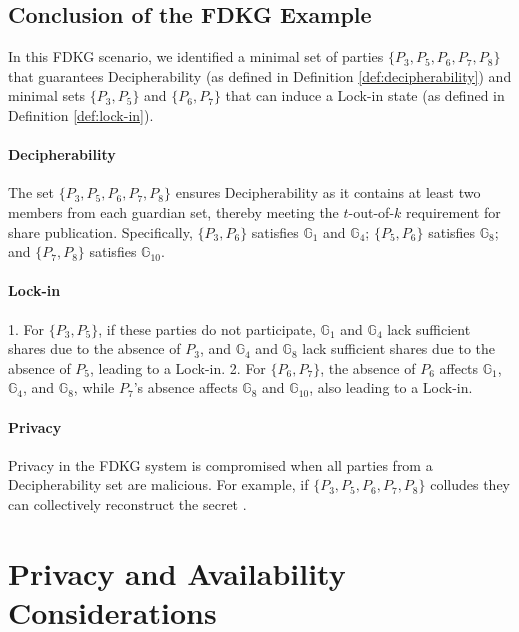 \documentclass{article}
\begin{document}
\subsection*{Conclusion of the FDKG Example}

In this FDKG scenario, we identified a minimal set of parties \(\{P_3, P_5, P_6, P_7, P_8\}\) that guarantees Decipherability (as defined in Definition \ref{def:decipherability}) and minimal sets \(\{P_3, P_5\}\) and \(\{P_6, P_7\}\) that can induce a Lock-in state (as defined in Definition \ref{def:lock-in}).

\paragraph{Decipherability}
The set \(\{P_3, P_5, P_6, P_7, P_8\}\) ensures Decipherability as it contains at least two members from each guardian set, thereby meeting the \(t\)-out-of-\(k\) requirement for share publication. Specifically, \(\{P_3, P_6\}\) satisfies \(\mathbb{G}_1\) and \(\mathbb{G}_4\); \(\{P_5, P_6\}\) satisfies \(\mathbb{G}_8\); and \(\{P_7, P_8\}\) satisfies \(\mathbb{G}_{10}\).

\paragraph{Lock-in}
1. For \(\{P_3, P_5\}\), if these parties do not participate, \(\mathbb{G}_1\) and \(\mathbb{G}_4\) lack sufficient shares due to the absence of \(P_3\), and \(\mathbb{G}_4\) and \(\mathbb{G}_8\) lack sufficient shares due to the absence of \(P_5\), leading to a Lock-in.
2. For \(\{P_6, P_7\}\), the absence of \(P_6\) affects \(\mathbb{G}_1\), \(\mathbb{G}_4\), and \(\mathbb{G}_8\), while \(P_7\)'s absence affects \(\mathbb{G}_8\) and \(\mathbb{G}_{10}\), also leading to a Lock-in.

\paragraph{Privacy}
Privacy in the FDKG system is compromised when all parties from a Decipherability set are malicious. For example, if \(\{P_3, P_5, P_6, P_7, P_8\}\) colludes they can collectively reconstruct the secret \DecryptionKey.

\section{Privacy and Availability Considerations}
\end{document}
